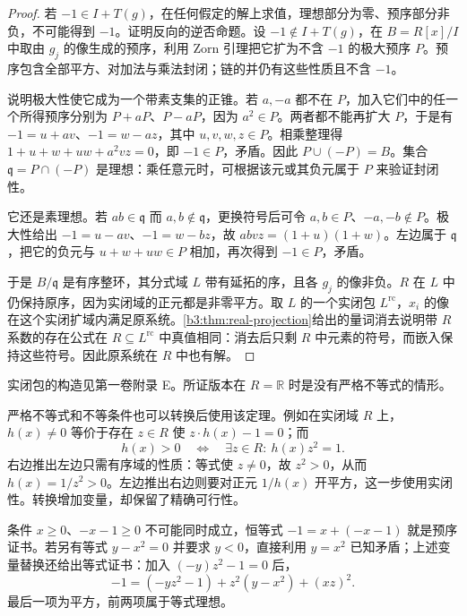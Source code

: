 \begin{proof}
	若 \(-1\in I+T(g)\)，在任何假定的解上求值，理想部分为零、预序部分非负，不可能得到 \(-1\)。证明反向的逆否命题。设 \(-1\notin I+T(g)\)，在 \(B=R[x]/I\) 中取由 \(g_j\) 的像生成的预序，利用 Zorn 引理把它扩为不含 \(-1\) 的极大预序 \(P\)。预序包含全部平方、对加法与乘法封闭；链的并仍有这些性质且不含 \(-1\)。

	说明极大性使它成为一个带素支集的正锥。若 \(a,-a\) 都不在 \(P\)，加入它们中的任一个所得预序分别为 \(P+aP\)、\(P-aP\)，因为 \(a^2\in P\)。两者都不能再扩大 \(P\)，于是有 \(-1=u+av\)、\(-1=w-az\)，其中 \(u,v,w,z\in P\)。相乘整理得 \(1+u+w+uw+a^2vz=0\)，即 \(-1\in P\)，矛盾。因此 \(P\cup(-P)=B\)。集合 \(\mathfrak q=P\cap(-P)\) 是理想：乘任意元时，可根据该元或其负元属于 \(P\) 来验证封闭性。

	它还是素理想。若 \(ab\in\mathfrak q\) 而 \(a,b\notin\mathfrak q\)，更换符号后可令 \(a,b\in P\)、\(-a,-b\notin P\)。极大性给出 \(-1=u-av\)、\(-1=w-bz\)，故 \(abvz=(1+u)(1+w)\)。左边属于 \(\mathfrak q\)，把它的负元与 \(u+w+uw\in P\) 相加，再次得到 \(-1\in P\)，矛盾。

	于是 \(B/\mathfrak q\) 是有序整环，其分式域 \(L\) 带有延拓的序，且各 \(g_j\) 的像非负。\(R\) 在 \(L\) 中仍保持原序，因为实闭域的正元都是非零平方。取 \(L\) 的一个实闭包 \(L^{\mathrm{rc}}\)，\(x_i\) 的像在这个实闭扩域内满足原系统。\cref{b3:thm:real-projection}给出的量词消去说明带 \(R\) 系数的存在公式在 \(R\subseteq L^{\mathrm{rc}}\) 中真值相同：消去后只剩 \(R\) 中元素的符号，而嵌入保持这些符号。因此原系统在 \(R\) 中也有解。
\end{proof}

实闭包的构造见第一卷附录 E。所证版本在 \(R=\mathbb R\) 时是\cite[Section 7.4, Theorem 7.5]{Sturmfels2002PolynomialEquations}没有严格不等式的情形。

\ProseParagraphBreak
严格不等式和不等条件也可以转换后使用该定理。例如在实闭域 \(R\) 上，\(h(x)\ne0\) 等价于存在 \(z\in R\) 使 \(z\cdot h(x)-1=0\)；而
\[
	h(x)>0\quad\Longleftrightarrow\quad \exists z\in R:\ h(x)z^2=1.
\]
右边推出左边只需有序域的性质：等式使 \(z\ne0\)，故 \(z^2>0\)，从而 \(h(x)=1/z^2>0\)。左边推出右边则要对正元 \(1/h(x)\) 开平方，这一步使用实闭性。转换增加变量，却保留了精确可行性。

\begin{example}\label{b3:exm:inconsistent-inequalities}
	条件 \(x\ge0\)、\(-x-1\ge0\) 不可能同时成立，恒等式 \(-1=x+(-x-1)\) 就是预序证书。若另有等式 \(y-x^2=0\) 并要求 \(y<0\)，直接利用 \(y=x^2\) 已知矛盾；上述变量替换还给出等式证书：加入 \((-y)z^2-1=0\) 后，
	\[
		-1=(-yz^2-1)+z^2(y-x^2)+(xz)^2.
	\]
	最后一项为平方，前两项属于等式理想。
\end{example}

